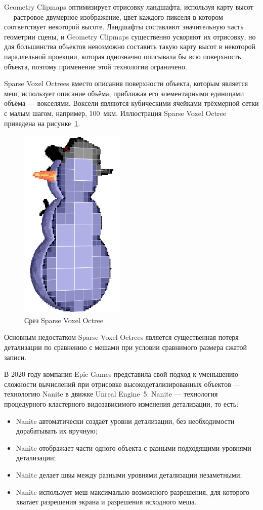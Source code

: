 Geometry Clipmaps оптимизирует отрисовку ландшафта, используя карту высот --- растровое двумерное изображение, цвет каждого пикселя в котором соответствует некоторой высоте.
Ландшафты составляют значительную часть геометрии сцены, и Geometry Clipmaps существенно ускоряют их отрисовку, но для большинства объектов невозможно составить такую карту высот в некоторой параллельной проекции, которая однозначно описывала бы всю поверхность объекта, поэтому применение этой технологии ограничено.

Sparse Voxel Octrees вместо описания поверхности объекта, которым является меш, использует описание объёма, приближая его элементарными единицами объёма --- вокселями.
Воксели являются кубическими ячейками трёхмерной сетки с малым шагом, например, 100~мкм.
Иллюстрация Sparse Voxel Octree~\cite{WikipediaSparseVoxelOctreeExample} приведена на рисунке~\ref{fig:SVO-voxel-snowman-slice-01}.

\begin{figure}[ht]
    \centering
    \includegraphics[width=5cm]{pics/SVO-voxel-snowman-slice-01.png}
    \caption{Срез Sparse Voxel Octree}
    \label{fig:SVO-voxel-snowman-slice-01}
\end{figure}

Основным недостатком Sparse Voxel Octrees является существенная потеря детализации по сравнению с мешами при условии сравнимого размера сжатой записи.

В 2020 году компания Epic Games представила свой подход к уменьшению сложности вычислений при отрисовке высокодетализированных объектов --- технологию Nanite в движке Unreal Engine~5.
Nanite --- технология процедурного кластерного видозависимого изменения детализации, то есть:
\begin{itemize}
    \item Nanite автоматически создаёт уровни детализации, без необходимости дорабатывать их вручную;
    \item Nanite отображает части одного объекта с разными подходящими уровнями детализации;
    \item Nanite делает швы между разными уровнями детализации незаметными;
    \item Nanite использует меш максимально возможного разрешения, для которого хватает разрешения экрана и разрешения исходного меша.
\end{itemize}

